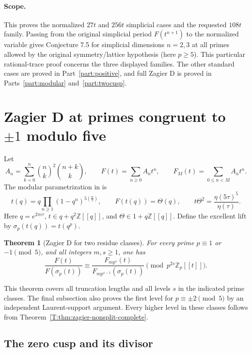 \documentclass[11pt,a4paper]{article}
\newtheorem{theorem}{Theorem}[section]
\theoremstyle{definition}\newtheorem{definition}[theorem]{Definition}
\theoremstyle{remark}\newtheorem{remark}[theorem]{Remark}
\numberwithin{equation}{section}
\begin{document}
\paragraph{Scope.}
This proves the normalized $27t$ and $256t$ simplicial cases and
the requested $108t$ family.  Passing from the original simplicial
period $F(t^{n+1})$ to the normalized variable gives Conjecture 7.5
for simplicial dimensions $n=2,3$ at all primes allowed by the
original symmetry/lattice hypothesis (here $p\geq5$).
This particular rational-trace proof concerns the three displayed families. The other standard cases are proved in Part~\ref{part:positive}, and full Zagier D is proved in Parts~\ref{part:modular} and~\ref{part:twocusp}.

\section{Zagier D at primes congruent to \texorpdfstring{$\pm1$}{plus or minus one} modulo five}\label{E:source-main-3}
\label{E:sec:zagier-d}

Let
\[
 A_n=\sum_{k=0}^{n}\binom nk^2\binom{n+k}{k},
 \qquad F(t)=\sum_{n\ge0}A_nt^n,
 \qquad F_M(t)=\sum_{0\le n<M}A_nt^n.
\]
The modular parametrization in \cite[Appendix B, \S8.8]{Beu26} is
\begin{equation}\label{E:eq:zagier-data}
 t(q)=q\prod_{n\ge1}(1-q^n)^{5(\frac n5)},\qquad
 F(t(q))=\Theta(q),\qquad
 t\Theta^2=\frac{\eta(5\tau)^5}{\eta(\tau)}.
\end{equation}
Here \(q=e^{2\pi i\tau}\), \(t\in q+q^2\mathbb Z[[q]]\), and
\(\Theta\in1+q\mathbb Z[[q]]\).  Define the excellent lift by
\(\sigma_p(t(q))=t(q^p)\).

\begin{theorem}[Zagier D for two residue classes]\label{E:thm:zagier-split}
For every prime \(p\equiv1\) or \(-1\pmod5\), and all integers
\(m,s\ge1\), one has
\[
 \frac{F(t)}{F(\sigma_p(t))}
 \equiv
 \frac{F_{mp^s}(t)}{F_{mp^{s-1}}(\sigma_p(t))}
 \pmod{p^{2s}\mathbb Z_p[[t]]}.
\]
\end{theorem}

This theorem covers all truncation lengths and all levels \(s\) in
the indicated prime classes.  The final subsection also proves the
first level for \(p\equiv\pm2\pmod5\) by an independent Laurent-support argument. Every higher level in these classes follows from Theorem~\ref{T:thm:zagier-nonsplit-complete}.

\subsection{The zero cusp and its divisor}
\end{document}

